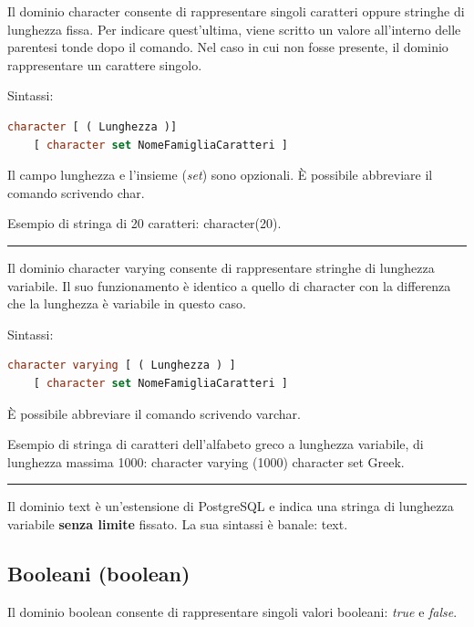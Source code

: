 \documentclass[a4paper]{article}
\newcommand{\longline}{\noindent\rule{\textwidth}{0.4pt}}
\begin{document}
	Il dominio \textcolor{Red3}{\textsf{character}} consente di rappresentare singoli caratteri oppure stringhe di lunghezza fissa. Per indicare quest'ultima, viene scritto un valore all'interno delle parentesi tonde dopo il comando. Nel caso in cui non fosse presente, il dominio rappresentare un carattere singolo.\newline
	
	\noindent
	Sintassi:
	\begin{lstlisting}[language=SQL]
character [ ( Lunghezza )]
	[ character set NomeFamigliaCaratteri ]	\end{lstlisting}
	Il campo lunghezza e l'insieme (\emph{set}) sono opzionali. È possibile abbreviare il comando scrivendo \textsf{char}.\newline
	
	\noindent
	Esempio di stringa di 20 caratteri: \textsf{character(20)}.\newline
	
	\longline
	
	\noindent
	Il dominio \textcolor{Red3}{\textsf{character varying}} consente di rappresentare stringhe di lunghezza variabile. Il suo funzionamento è identico a quello di \textsf{character} con la differenza che la lunghezza è variabile in questo caso.\newline
	
	\noindent
	Sintassi:
	\begin{lstlisting}[language=SQL]
character varying [ ( Lunghezza ) ]
	[ character set NomeFamigliaCaratteri ]	\end{lstlisting}
	È possibile abbreviare il comando scrivendo \textsf{varchar}.\newline
	
	\noindent
	Esempio di stringa di caratteri dell'alfabeto greco a lunghezza variabile, di lunghezza massima 1000: \textsf{character varying (1000) character set Greek}.\newline
	
	\longline
	
	\noindent
	Il dominio \textcolor{Red3}{text} è un'estensione di PostgreSQL e indica una stringa di lunghezza variabile \textbf{senza limite} fissato. La sua sintassi è banale: \textsf{text}.\newpage
	
	\subsection{Booleani (\textsf{boolean})}
	
	Il dominio \textcolor{Red3}{\textsf{boolean}} consente di rappresentare singoli valori booleani: \emph{true} e \emph{false}.
	
\end{document}
